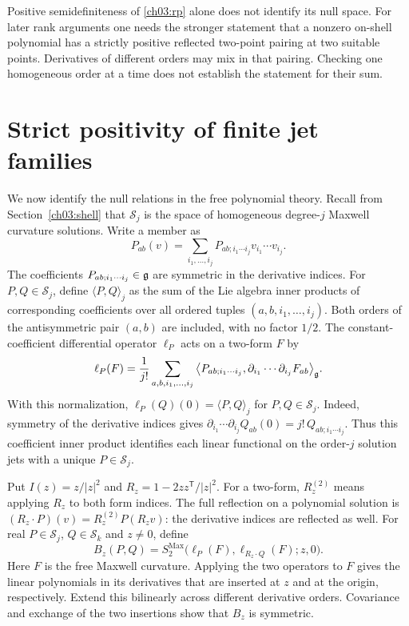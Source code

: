 Positive semidefiniteness of \eqref{ch03:rp} alone does not identify its
null space. For later rank arguments one needs the stronger statement
that a nonzero on-shell polynomial has a strictly positive reflected
two-point pairing at two suitable points. Derivatives of different
orders may mix in that pairing. Checking one homogeneous order at a
time does not establish the statement for their sum.

\section{Strict positivity of finite jet families}\label{ch03:strict}

We now identify the null relations in the free polynomial theory.
Recall from Section~\ref{ch03:shell} that $\mathcal S_j$ is the space
of homogeneous degree-$j$ Maxwell curvature solutions. Write a member as
\[
 P_{ab}(v)=\sum_{i_1,\ldots,i_j}
 P_{ab;i_1\cdots i_j}v_{i_1}\cdots v_{i_j}.
\]
The coefficients $P_{ab;i_1\cdots i_j}\in\mathfrak g$ are symmetric in the
derivative indices. For $P,Q\in\mathcal S_j$, define $\langle P,Q\rangle_j$
as the sum of the Lie algebra inner products of corresponding coefficients
over all ordered tuples $(a,b,i_1,\ldots,i_j)$. Both orders of the
antisymmetric pair $(a,b)$ are included, with no factor $1/2$.
The constant-coefficient differential operator $\ell_P$ acts on a
two-form $F$ by
\begin{equation}\label{ch03:probe}
 \ell_P(F)=\frac1{j!}\sum_{a,b,i_1,\ldots,i_j}
 \big\langle P_{ab;i_1\cdots i_j},
       \partial_{i_1}\cdots\partial_{i_j}F_{ab}\big\rangle_{\mathfrak g}.
\end{equation}
With this normalization, $\ell_P(Q)(0)=\langle P,Q\rangle_j$ for
$P,Q\in\mathcal S_j$. Indeed, symmetry of the derivative indices gives
$\partial_{i_1}\cdots\partial_{i_j}Q_{ab}(0)=j!\,Q_{ab;i_1\cdots i_j}$.
Thus this coefficient inner product identifies each linear functional on
the order-$j$ solution jets with a unique $P\in\mathcal S_j$.

Put $I(z)=z/|z|^2$ and
$R_z=1-2zz^{\mathsf T}/|z|^2$. For a two-form, $R_z^{(2)}$ means
applying $R_z$ to both form indices. The full reflection on a
polynomial solution is
$(R_z\cdot P)(v)=R_z^{(2)}P(R_zv)$: the derivative indices are
reflected as well. For real $P\in\mathcal S_j$, $Q\in\mathcal S_k$ and
$z\ne0$, define
\[
 B_z(P,Q)=S_2^{\mathrm{Max}}\bigl(\ell_P(F),\ell_{R_z\cdot Q}(F);z,0\bigr).
\]
Here $F$ is the free Maxwell curvature. Applying the two operators to $F$
gives the linear polynomials in its derivatives that are inserted at $z$
and at the origin, respectively.
Extend this bilinearly across different derivative orders. Covariance and
exchange of the two insertions show that $B_z$ is symmetric.

